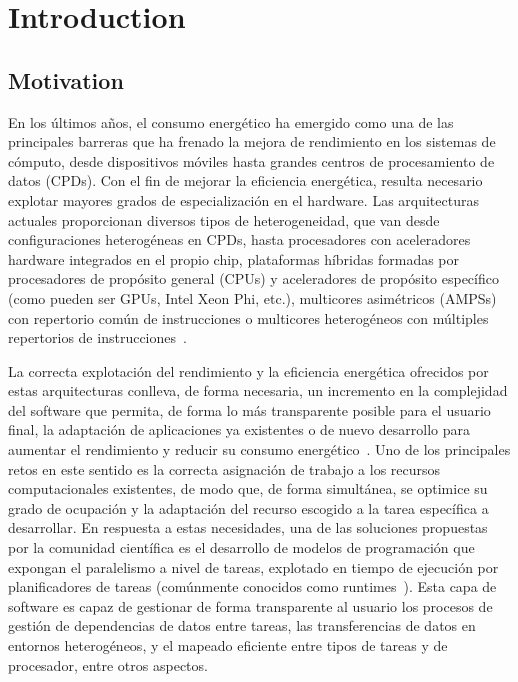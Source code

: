 \cleardoublepage


\chapter{Introduction}
\label{ch:chapter1}

\section{Motivation}

En los últimos años, el consumo energético ha emergido como una de las
principales barreras que ha frenado la mejora de rendimiento en los
sistemas de cómputo, desde dispositivos móviles hasta grandes centros de
procesamiento de datos (CPDs). Con el fin de mejorar la eficiencia
energética, resulta necesario explotar mayores grados de especialización en
el hardware. Las arquitecturas actuales proporcionan diversos tipos de
heterogeneidad, que van desde configuraciones heterogéneas en CPDs, hasta
procesadores con aceleradores hardware integrados en el propio chip,
plataformas híbridas formadas por procesadores de propósito general (CPUs)
y aceleradores de propósito específico (como pueden ser GPUs, Intel Xeon
Phi, etc.), multicores asimétricos (AMPSs) con repertorio común de
instrucciones o multicores heterogéneos con múltiples repertorios de
instrucciones~\cite{NRC2011,KoSh13}.



La correcta explotación del rendimiento y la eficiencia energética
ofrecidos por estas arquitecturas conlleva, de forma necesaria, un
incremento en la complejidad del software que permita, de forma lo más
transparente posible para el usuario final, la adaptación de aplicaciones
ya existentes o de nuevo desarrollo para aumentar el rendimiento y reducir
su consumo energético~\cite{OsTo10,SKC+15}. Uno de los principales retos en
este sentido es la correcta asignación de trabajo a los recursos
computacionales existentes, de modo que, de forma simultánea, se optimice
su grado de ocupación y la adaptación del recurso escogido a la tarea
específica a desarrollar. En respuesta a estas necesidades, una de las
soluciones propuestas por la comunidad científica es el desarrollo de
modelos de programación que expongan el paralelismo a nivel de tareas,
explotado en tiempo de ejecución por planificadores de tareas (comúnmente
conocidos como runtimes~\cite{VMC+14}). Esta capa de software es capaz de
gestionar de forma transparente al usuario los procesos de gestión de
dependencias de datos entre tareas, las transferencias de datos en entornos
heterogéneos, y el mapeado eficiente entre tipos de tareas y de procesador,
entre otros aspectos.

